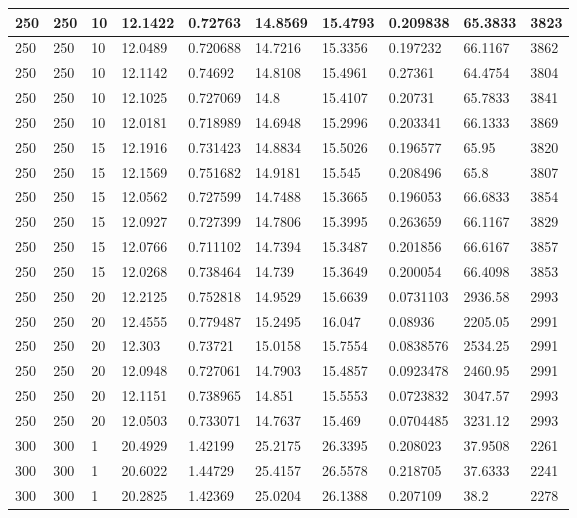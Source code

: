 \begin{landscape}
\begin{longtable}{ | l | l | l | l | l | l | l | l | l | l | }
250 & 250 & 10 & 12.1422 & 0.72763 & 14.8569 & 15.4793 & 0.209838 & 65.3833 & 3823\\ \hline
250 & 250 & 10 & 12.0489 & 0.720688 & 14.7216 & 15.3356 & 0.197232 & 66.1167 & 3862\\ \hline
250 & 250 & 10 & 12.1142 & 0.74692 & 14.8108 & 15.4961 & 0.27361 & 64.4754 & 3804\\ \hline
250 & 250 & 10 & 12.1025 & 0.727069 & 14.8 & 15.4107 & 0.20731 & 65.7833 & 3841\\ \hline
250 & 250 & 10 & 12.0181 & 0.718989 & 14.6948 & 15.2996 & 0.203341 & 66.1333 & 3869\\ \hline
250 & 250 & 15 & 12.1916 & 0.731423 & 14.8834 & 15.5026 & 0.196577 & 65.95 & 3820\\ \hline
250 & 250 & 15 & 12.1569 & 0.751682 & 14.9181 & 15.545 & 0.208496 & 65.8 & 3807\\ \hline
250 & 250 & 15 & 12.0562 & 0.727599 & 14.7488 & 15.3665 & 0.196053 & 66.6833 & 3854\\ \hline
250 & 250 & 15 & 12.0927 & 0.727399 & 14.7806 & 15.3995 & 0.263659 & 66.1167 & 3829\\ \hline
250 & 250 & 15 & 12.0766 & 0.711102 & 14.7394 & 15.3487 & 0.201856 & 66.6167 & 3857\\ \hline
250 & 250 & 15 & 12.0268 & 0.738464 & 14.739 & 15.3649 & 0.200054 & 66.4098 & 3853\\ \hline
250 & 250 & 20 & 12.2125 & 0.752818 & 14.9529 & 15.6639 & 0.0731103 & 2936.58 & 2993\\ \hline
250 & 250 & 20 & 12.4555 & 0.779487 & 15.2495 & 16.047 & 0.08936 & 2205.05 & 2991\\ \hline
250 & 250 & 20 & 12.303 & 0.73721 & 15.0158 & 15.7554 & 0.0838576 & 2534.25 & 2991\\ \hline
250 & 250 & 20 & 12.0948 & 0.727061 & 14.7903 & 15.4857 & 0.0923478 & 2460.95 & 2991\\ \hline
250 & 250 & 20 & 12.1151 & 0.738965 & 14.851 & 15.5553 & 0.0723832 & 3047.57 & 2993\\ \hline
250 & 250 & 20 & 12.0503 & 0.733071 & 14.7637 & 15.469 & 0.0704485 & 3231.12 & 2993\\ \hline
300 & 300 & 1 & 20.4929 & 1.42199 & 25.2175 & 26.3395 & 0.208023 & 37.9508 & 2261\\ \hline
300 & 300 & 1 & 20.6022 & 1.44729 & 25.4157 & 26.5578 & 0.218705 & 37.6333 & 2241\\ \hline
300 & 300 & 1 & 20.2825 & 1.42369 & 25.0204 & 26.1388 & 0.207109 & 38.2 & 2278\\ \hline

\end{longtable}
\end{landscape}
